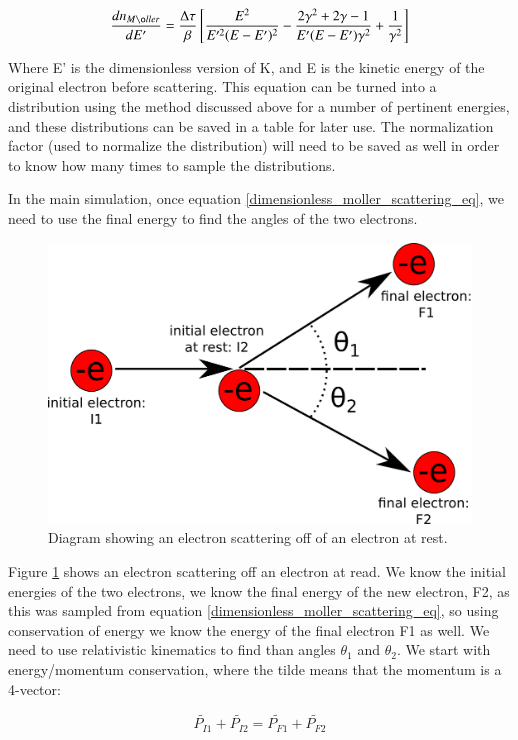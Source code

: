 \documentclass[]{article}
\begin{document}
\begin{equation} 
\label{dimensionless_moller_scattering_eq}
\frac{dn_{M\o ller}}{d E'} = \frac{\Delta \tau}{\beta}\left[  \frac{E^2}{E'^2(E-E')^2} - \frac{2\gamma^2 + 2\gamma -1}{E'(E-E')\gamma^2}  + \frac{1}{\gamma^2}  \right]
\end{equation}

Where E' is the dimensionless version of K, and E is the kinetic energy of the original electron before scattering. This equation can be turned into a distribution using the method discussed above for a number of pertinent energies, and these distributions can be saved in a table for later use. The normalization factor (used to normalize the distribution) will need to be saved as well in order to know how many times to sample the distributions.

In the main simulation, once equation \ref{dimensionless_moller_scattering_eq}, we need to use the final energy to find the angles of the two electrons.

\begin{figure}
\centering
\includegraphics[width=0.7\linewidth]{./scattering_kinematics}
\caption{Diagram showing an electron scattering off of an electron at rest.}
\label{scattering_kin_fig}
\end{figure}

Figure \ref{scattering_kin_fig} shows an electron scattering off an electron at read. We know the initial energies of the two electrons, we know the final energy of the new electron, F2, as this was sampled from equation \ref{dimensionless_moller_scattering_eq}, so using conservation of energy we know the energy of the final electron F1 as well. We need to use relativistic kinematics to find than angles $\theta_1$ and $\theta_2$. We start with energy/momentum conservation, where the tilde means that the momentum is a 4-vector:

\[ 
\tilde{P_{I1}}+\tilde{P_{I2}}=\tilde{P_{F1}}+\tilde{P_{F2}}
\]
\end{document}

